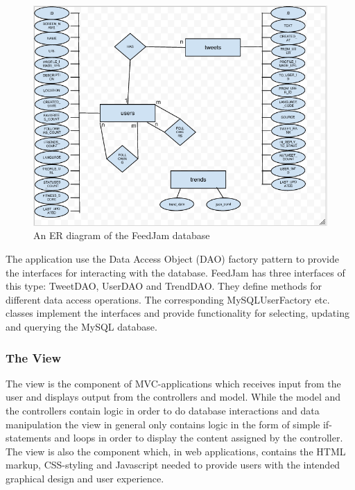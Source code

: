 \begin{figure}[ht]
    \begin{minipage}[b]{1\linewidth}
        \centering
        \includegraphics[width=1\textwidth]{figures/erDiagram}
        \caption{An ER diagram of the FeedJam database}
        \label{fig:erDiagram}
    \end{minipage}
\end{figure}


The application use the Data Access Object (DAO) factory pattern to provide the interfaces for interacting with the database. FeedJam has three interfaces of this type: TweetDAO, UserDAO and TrendDAO. They define methods for different data access  operations. The corresponding MySQLUserFactory etc. classes implement the interfaces and provide functionality for selecting, updating and querying the MySQL database.

\subsubsection{The View}
The view is the component of MVC-applications which receives input from the user and displays output from the controllers and model. While the model and the controllers contain logic in order to do database interactions and data manipulation the view in general only contains logic in the form of simple if-statements and loops in order to display the content assigned by the controller. The view is also the component which, in web applications, contains the HTML markup, CSS-styling and Javascript needed to provide users with the intended graphical design and user experience.

